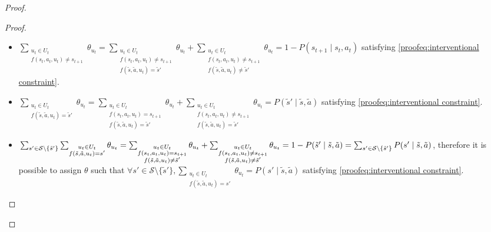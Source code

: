 \begin{proof}
\begin{proof}
\begin{itemize}
        \item $\sum_{\substack{u_t \in U_t\\f(s_t, a_t, u_t) \neq s_{t+1}}}{\theta_{u_t}} = \sum_{\substack{u_t \in U_t \\f(s_t, a_t, u_t) \neq s_{t+1} \\ f(\tilde{s}, \tilde{a}, u_t) = \tilde{s}'}} \theta_{u_t} + \sum_{\substack{u_t \in U_t \\f(s_t, a_t, u_t) \neq s_{t+1} \\ f(\tilde{s}, \tilde{a}, u_t) \neq \tilde{s}'}} \theta_{u_t} =1 -
        P(s_{t+1} \mid s_t, a_t)$ satisfying \eqref{proofeq:interventional constraint}.
        
        \item $\sum_{\substack{u_t \in U_t \\f(\tilde{s}, \tilde{a}, u_t) = \tilde{s}'}} \theta_{u_t} = \sum_{\substack{u_t \in U_t \\f(s_t, a_t, u_t) = s_{t+1} \\ f(\tilde{s}, \tilde{a}, u_t) = \tilde{s}'}} \theta_{u_t} + \sum_{\substack{u_t \in U_t \\f(s_t, a_t, u_t) \neq s_{t+1} \\ f(\tilde{s}, \tilde{a}, u_t) = \tilde{s}'}} \theta_{u_t} = P(\tilde{s}' \mid \tilde{s}, \tilde{a})$ satisfying \eqref{proofeq:interventional constraint}.
        
        \item $\sum_{s' \in \mathcal{S}\setminus\{\tilde{s}'\}}\sum_{\substack{u_t \in U_t \\f(\tilde{s}, \tilde{a}, u_t) = s'}} \theta_{u_t} = \sum_{\substack{u_t \in U_t \\f(s_t, a_t, u_t) = s_{t+1} \\ f(\tilde{s}, \tilde{a}, u_t) \neq \tilde{s}'}} \theta_{u_t} + \sum_{\substack{u_t \in U_t \\f(s_t, a_t, u_t) \neq s_{t+1} \\ f(\tilde{s}, \tilde{a}, u_t) \neq \tilde{s}'}} \theta_{u_t} \\ = 1 - P(\tilde{s}' \mid \tilde{s}, \tilde{a}) = \sum_{s' \in \mathcal{S}\setminus\{\tilde{s}'\}}P(s' \mid \tilde{s}, \tilde{a})$, therefore it is possible to assign $\theta$ such that $\forall s' \in \mathcal{S}\setminus\{\tilde{s}'\}, \sum_{\substack{u_t \in U_t \\ f(\tilde{s}, \tilde{a}, u_t) = s'}}{\theta_{u_t}} = P(s' \mid \tilde{s}, \tilde{a})$ satisfying \eqref{proofeq:interventional constraint}.
        

\end{itemize}
\end{proof}
\end{proof}
